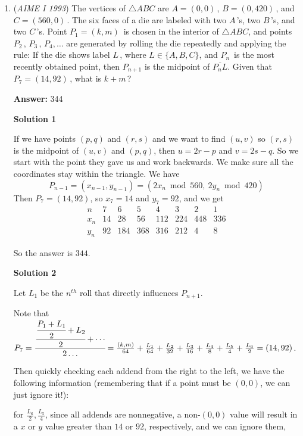 \begin{enumerate}
 


	\item (\textit{AIME I 1993}) The vertices of $\triangle ABC$ are $A = (0,0)\,$, $B = (0,420)\,$, and $C = (560,0)\,$.  The six faces of a die are labeled with two $A\,$'s, two $B\,$'s, and two $C\,$'s.  Point $P_1 = (k,m)\,$ is chosen in the interior of $\triangle ABC$, and points $P_2\,$, $P_3\,$, $P_4, \dots$ are generated by rolling the die repeatedly and applying the rule: If the die shows label $L\,$, where $L \in \{A, B, C\}$, and $P_n\,$ is the most recently obtained point, then $P_{n + 1}^{}$ is the midpoint of $\overline{P_n L}$.  Given that $P_7 = (14,92)\,$, what is $k + m\,$?


 
 \textbf{Answer: }344



\textbf{Solution 1}

If we have points $(p,q)$ and $(r,s)$ and we want to find $(u,v)$ so $(r,s)$ is the midpoint of $(u,v)$ and $(p,q)$, then $u=2r-p$ and $v=2s-q$. So we start with the point they gave us and work backwards. We make sure all the coordinates stay within the triangle. We have 
 \[P_{n-1}=(x_{n-1},y_{n-1}) = (2x_n\bmod{560},\ 2y_n\bmod{420})\]Then $P_7=(14,92)$, so $x_7=14$ and $y_7=92$, and we get 
 \[\begin{array}{c||ccccccc} n & 7 & 6 & 5 & 4 & 3 & 2 & 1 \\ \hline\hline x_n & 14 & 28 & 56 & 112 & 224 & 448 & 336 \\ \hline y_n & 92 & 184 & 368 & 316 & 212 & 4 & 8  \end{array}\]

 So the answer is $\boxed{344}$.

 



\textbf{Solution 2}

Let $L_1$ be the $n^{th}$ roll that directly influences $P_{n + 1}$. 

 Note that $P_7 = \cfrac{\cfrac{\cfrac{P_1 + L_1}2 + L_2}2 + \cdots}{2\ldots} = \frac {(k,m)}{64} + \frac {L_1}{64} + \frac {L_2}{32} + \frac {L_3}{16} + \frac {L_4}8 + \frac {L_5}4 + \frac {L_6}2 = (14,92)$. 

 
Then quickly checking each addend from the right to the left, we have the following information (remembering that if a point must be $(0,0)$, we can just ignore it!): 

 for $\frac {L_6}2,\frac {L_5}4$, since all addends are nonnegative, a non-$(0,0)$ value will result in a $x$ or $y$ value greater than $14$ or $92$, respectively, and we can ignore them,


\end{enumerate}
